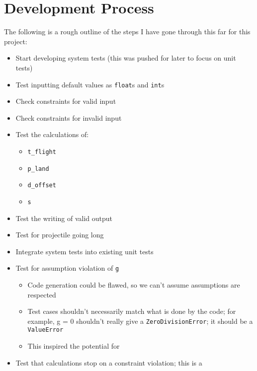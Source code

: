 \chapter{Development Process}
\label{chap:dev-proc}

The following is a rough outline of the steps I have gone through this far for
this project:

\begin{itemize}
      \item Start developing system tests (this was pushed for later to
            focus on unit tests)
      \item Test inputting default values as \texttt{float}s and \texttt{int}s
      \item Check constraints for valid input
      \item Check constraints for invalid input
      \item Test the calculations of:
            \begin{itemize}
                  \item \texttt{t\_flight}
                  \item \texttt{p\_land}
                  \item \texttt{d\_offset}
                  \item \texttt{s}
            \end{itemize}
      \item Test the writing of valid output
      \item Test for projectile going long
      \item Integrate system tests into existing unit tests
      \item Test for assumption violation of \texttt{g}
            \begin{itemize}
                  \item Code generation could be flawed, so we can't assume
                        assumptions are respected
                  \item Test cases shouldn't necessarily match what is done by the
                        code; for example, g = 0 shouldn't really give a
                        \texttt{ZeroDivisionError}; it should be a \texttt{ValueError}
                  \item This inspired the potential for
            \end{itemize}
      \item Test that calculations stop on a constraint violation; this is a

\end{itemize}
